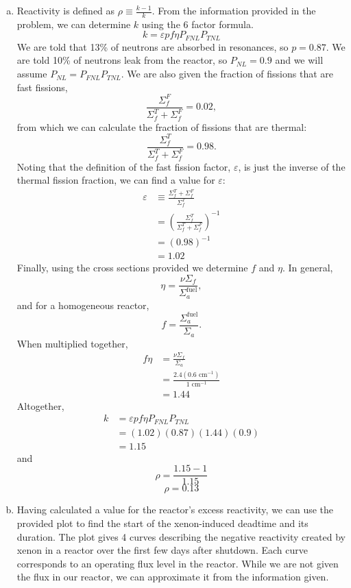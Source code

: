 \documentclass{report}
\begin{document}
\begin{enumerate}[a)]

\item Reactivity is defined as $\rho \equiv \frac{k - 1}{k}$. From the information provided in the problem, we can determine $k$ using the 6 factor formula. 
$$ k = \varepsilon p f \eta P_{\textit{FNL}} P_{\textit{TNL}} $$
We are told that 13\% of neutrons are absorbed in resonances, so $p = 0.87$. We are told 10\% of neutrons leak from the reactor, so $P_{\textit{NL}} = 0.9$ and we will assume $P_{\textit{NL}} = P_{\textit{FNL}} P_{\textit{TNL}}$. We are also given the fraction of fissions that are fast fissions,
$$ \frac{\Sigma_f^F}{\Sigma_f^T + \Sigma_f^F} = 0.02 ,$$
from which we can calculate the fraction of fissions that are thermal:
$$ \frac{\Sigma_f^T}{\Sigma_f^T + \Sigma_f^F} = 0.98 .$$
Noting that the definition of the fast fission factor, $\varepsilon$, is just the inverse of the thermal fission fraction, we can find a value for $\varepsilon$:
\begin{align*}
\varepsilon	&\equiv \frac{\Sigma_f^T + \Sigma_f^F}{\Sigma_f^T} \\
			&= \left(\frac{\Sigma_f^T}{\Sigma_f^T + \Sigma_f^F}\right)^{-1} \\
			&= \left(0.98\right)^{-1} \\
			&= 1.02 
\end{align*}
Finally, using the cross sections provided we determine $f$ and $\eta$. In general,
$$ \eta = \frac{\nu\Sigma_f}{\Sigma_a^{\text{fuel}}} ,$$
and for a homogeneous reactor, 
$$ f = \frac{\Sigma_a^{\text{fuel}}}{\Sigma_a} .$$
When multiplied together,
\begin{align*}
f \eta	&= \frac{\nu\Sigma_f}{\Sigma_a} \\
		&= \frac{2.4\left(0.6\text{ cm}^{-1}\right)}{1\text{ cm}^{-1}} \\
		&= 1.44
\end{align*}
Altogether,
\begin{align*}
k	&= \varepsilon p f \eta P_{\textit{FNL}} P_{\textit{TNL}} \\
	&= \left(1.02\right)\left(0.87\right)\left(1.44\right)\left(0.9\right) \\
	&= 1.15
\end{align*}
and
$$ \rho = \frac{1.15-1}{1.15} $$
$$\boxed{ \rho = 0.13 }$$

\item Having calculated a value for the reactor's excess reactivity, we can use the provided plot to find the start of the xenon-induced deadtime and its duration. The plot gives 4 curves describing the negative reactivity created by xenon in a reactor over the first few days after shutdown. Each curve corresponds to an operating flux level in the reactor. While we are not given the flux in our reactor, we can approximate it from the information given. 


\end{enumerate}
\end{document}
